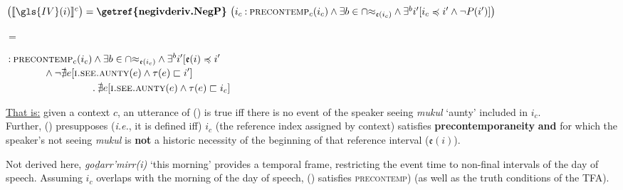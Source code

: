 \a \textbf{} $\big(\denote[c]{\gls{IV}(i)}\big)=\textbf{\getref{negivderiv.NegP}}\ \big(i_c\mathbin:\textsc{precontemp}_c(i_c)\wedge\exists b\in\cap{\approx_{\mathfrak{e}(i_c)}}\wedge\exists^b i'[i_c\preccurlyeq i'\wedge\neg P(i')]\big)$


\a{}$ = $

\hspace*{\fill}$\begin{multlined}\mathbin:\textsc{precontemp}_c(i_c)\wedge\exists b\in\cap{\approx_{\mathfrak{e}(i_c)}}\wedge\exists^b i'[\mathfrak{e}(i)\preccurlyeq i'\\\wedge\neg\nexists e[\textsc{i.see.aunty}(e)\wedge \tau(e)\sqsubset i']\\
	\mathbin.\nexists e[\textsc{i.see.aunty}(e)\wedge\tau(e)\sqsubset i_c]\end{multlined}$

\ul{That is:} given a context $ c $, an utterance of {()} is true iff there is no event of the speaker seeing \textit{mukul} `aunty' included in $ i_c $.
\\Further, () presupposes (\textit{i.e.}, it is defined iff) $ i_c $ (the reference index assigned by context) satisfies \textbf{precontemporaneity} \textbf{and} for which the speaker's not seeing \textit{mukul} is \textbf{not} a historic necessity of the beginning of that reference interval ($ \mathfrak e(i) $).
\xe

\noindent Not derived here, \textit{goḏarr'mirr(i)} `this morning' provides a temporal frame, restricting the event time to non-final intervals of the day of speech. Assuming $ i_c $ overlaps with the morning of the day of speech, (\lastx) satisfies \textsc{precontemp)} (as well as the truth conditions of the \gls{TFA}). 


